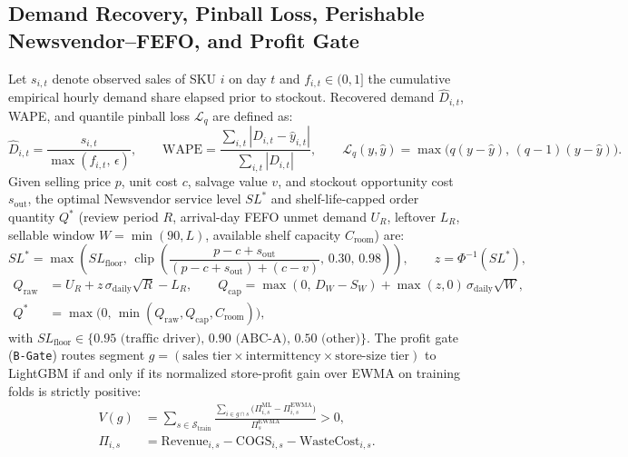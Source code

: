 \subsection*{Demand Recovery, Pinball Loss, Perishable Newsvendor--FEFO, and Profit Gate}
Let $s_{i,t}$ denote observed sales of SKU $i$ on day $t$ and $f_{i,t} \in (0,1]$ the cumulative empirical hourly demand share elapsed prior to stockout. Recovered demand $\hat{D}_{i,t}$, WAPE, and quantile pinball loss $\mathcal{L}_q$ are defined as:
\begin{equation}
    \hat{D}_{i,t} = \frac{s_{i,t}}{\max(f_{i,t},\,\epsilon)}, \qquad
    \text{WAPE} = \frac{\sum_{i,t} \left|D_{i,t} - \hat{y}_{i,t}\right|}{\sum_{i,t} \left|D_{i,t}\right|}, \qquad
    \mathcal{L}_q(y, \hat{y}) = \max\bigl(q(y-\hat{y}),\,(q-1)(y-\hat{y})\bigr).
    \label{eq:wape_recovery}
\end{equation}
Given selling price $p$, unit cost $c$, salvage value $v$, and stockout opportunity cost $s_{\text{out}}$, the optimal Newsvendor service level $SL^*$ and shelf-life-capped order quantity $Q^*$ (review period $R$, arrival-day FEFO unmet demand $U_R$, leftover $L_R$, sellable window $W = \min(90, L)$, available shelf capacity $C_{\text{room}}$) are:
\begin{equation}
    SL^* = \max\!\left(SL_{\text{floor}},\, \operatorname{clip}\!\left(\frac{p - c + s_{\text{out}}}{(p - c + s_{\text{out}}) + (c - v)},\,0.30,\,0.98\right)\right), \qquad z = \Phi^{-1}(SL^*),
    \label{eq:newsvendor}
\end{equation}
\begin{equation}
\begin{aligned}
    Q_{\text{raw}} &= U_R + z\,\sigma_{\text{daily}}\sqrt{R} - L_R, \qquad
    Q_{\text{cap}} = \max(0,\, D_W - S_W) + \max(z,0)\,\sigma_{\text{daily}}\sqrt{W}, \\
    Q^* &= \max\!\bigl(0,\,\min(Q_{\text{raw}}, Q_{\text{cap}}, C_{\text{room}})\bigr),
\end{aligned}
    \label{eq:order_qty}
\end{equation}
with $SL_{\text{floor}} \in \{0.95\text{ (traffic driver)},\,0.90\text{ (ABC-A)},\,0.50\text{ (other)}\}$. The profit gate (\texttt{B-Gate}) routes segment $g = (\text{sales tier} \times \text{intermittency} \times \text{store-size tier})$ to LightGBM if and only if its normalized store-profit gain over EWMA on training folds is strictly positive:
\begin{equation}
\begin{aligned}
    V(g) &= \sum_{s \in \mathcal{S}_{\text{train}}} \frac{\sum_{i \in g \cap s}\bigl(\Pi^{\text{ML}}_{i,s} - \Pi^{\text{EWMA}}_{i,s}\bigr)}{\Pi^{\text{EWMA}}_s} > 0, \\
    \Pi_{i,s} &= \text{Revenue}_{i,s} - \text{COGS}_{i,s} - \text{WasteCost}_{i,s}.
\end{aligned}
    \label{eq:profit_gate}
\end{equation}
